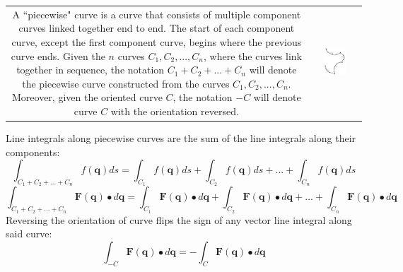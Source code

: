 \documentclass{article}
\begin{document}
\begin{tabular}{cc}
\parbox{0.5\textwidth}{
A ``piecewise" curve is a curve that consists of multiple component curves linked together end to end. The start of each component curve, except the first component curve, begins where the previous curve ends. Given the \(n\) curves \(C_1, C_2, ..., C_n\), where the curves link together in sequence, the notation \(C_1 + C_2 + ... + C_n\) will denote the piecewise curve constructed from the curves \(C_1, C_2, ..., C_n\). 
Moreover, given the oriented curve \(C\), the notation \(-C\) will denote curve \(C\) with the orientation reversed. 
} & \parbox{0.5\textwidth}{
\includegraphics[width = 0.5\textwidth]{piecewise_curve}
}
\end{tabular}

Line integrals along piecewise curves are the sum of the line integrals along their components:
\[\int_{C_1 + C_2 + ... + C_n} f(\mathbf{q})ds = \int_{C_1} f(\mathbf{q})ds + \int_{C_2} f(\mathbf{q})ds + ... + \int_{C_n} f(\mathbf{q})ds\]
\[\int_{C_1 + C_2 + ... + C_n} \mathbf{F}(\mathbf{q}) \bullet d\mathbf{q} = \int_{C_1} \mathbf{F}(\mathbf{q}) \bullet d\mathbf{q} + \int_{C_2} \mathbf{F}(\mathbf{q}) \bullet d\mathbf{q} + ... + \int_{C_n} \mathbf{F}(\mathbf{q}) \bullet d\mathbf{q}\]
Reversing the orientation of curve flips the sign of any vector line integral along said curve:
\[\int_{-C} \mathbf{F}(\mathbf{q}) \bullet d\mathbf{q} = -\int_C \mathbf{F}(\mathbf{q}) \bullet d\mathbf{q}\]
\end{document}
